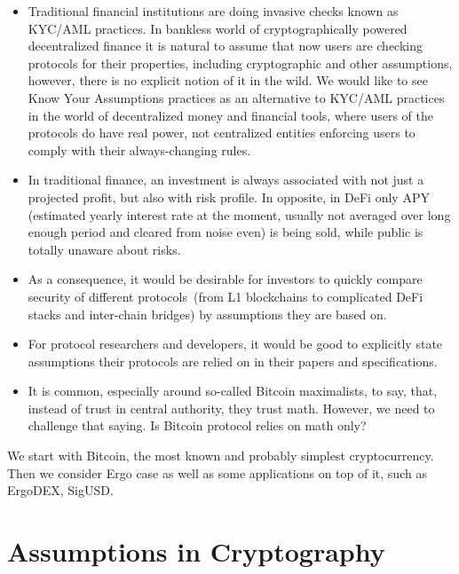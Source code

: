 \documentclass{article}   %
\begin{document}
\begin{itemize}
\item{} Traditional financial institutions are doing invasive checks known as KYC/AML practices.
In bankless world of cryptographically powered decentralized finance it is natural to assume that
now users are checking protocols for their properties, including cryptographic and other assumptions,
however, there is no explicit notion of it in the wild. We would like to see Know Your Assumptions practices  
as an alternative to KYC/AML practices in the world of decentralized money and financial tools, where users 
of the protocols do have real power, not centralized entities enforcing users to comply with their always-changing rules. 

\item{} In traditional finance, an investment is always associated with not 
just a projected profit, but also with risk profile. In opposite, in DeFi only 
APY (estimated yearly interest rate at the moment, usually not averaged over long enough period and cleared from noise even) is being sold, while public is totally unaware 
about risks.

\item{} As a consequence, it would be desirable for investors to quickly compare security of different protocols~(from L1 blockchains to complicated DeFi stacks and inter-chain bridges) by assumptions they are based on.

\item{} For protocol researchers and developers, it would be good to explicitly state assumptions their protocols are relied on in their papers and specifications. 

\item{} It is common, especially around so-called Bitcoin maximalists, to say, that, instead of trust in central authority, they trust math. However, we need to challenge that saying. Is Bitcoin protocol relies on math only? 
\end{itemize}

We start with Bitcoin, the most known and probably simplest cryptocurrency. Then we consider Ergo case as well as some
applications on top of it, such as ErgoDEX, SigUSD. 

\section{Assumptions in Cryptography}
\end{document}
